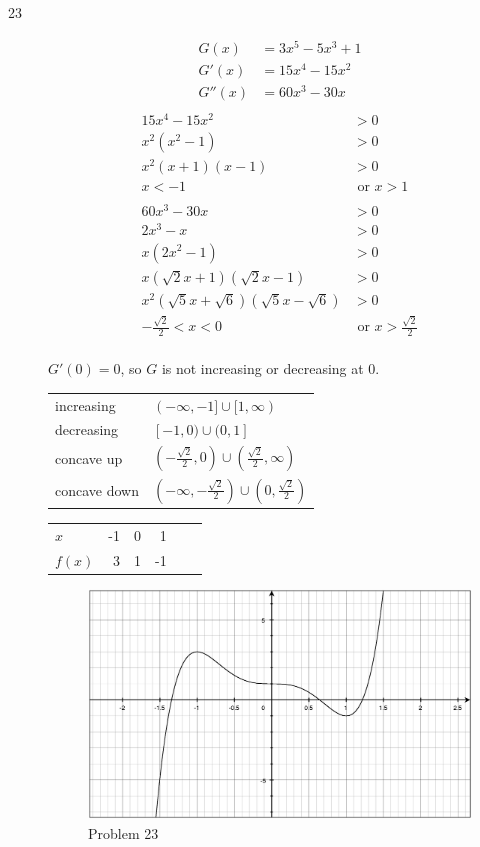 \documentclass[fleqn]{exam}
\begin{document}
\begin{description}
\item[23]
\begin{align*}
  G(x)   &= 3x^5 - 5x^3 + 1 \\
  G'(x)  &= 15x^4 - 15x^2  \\
  G''(x) &= 60x^3 - 30x \\
\end{align*}
\begin{align*}
  15x^4 - 15x^2 &> 0 \\
  x^2(x^2 - 1) &> 0 \\
  x^2(x+1)(x - 1) &> 0 \\
  x < -1 & \text{ or } x > 1 \\
\\
  60x^3 - 30x &> 0 \\
  2x^3 - x &> 0 \\
  x(2x^2 - 1) &> 0 \\
  x(\sqrt{2} x + 1)(\sqrt{2} x - 1) &> 0 \\
  x^2 (\sqrt{5}x + \sqrt{6}) (\sqrt{5}x - \sqrt{6}) &> 0 \\
  -\frac{\sqrt{2}}{2} < x < 0 & \text{ or } x > \frac{\sqrt{2}}{2} \\
\end{align*}

$G'(0) = 0$, so $G$ is not increasing or decreasing at 0.

\begin{tabular}{ll}
\toprule
increasing & $(-\infty, -1] \cup [1, \infty)$  \\
decreasing & $[-1, 0) \cup (0, 1]$ \\
\midrule
concave up & $\left(-\frac{\sqrt{2}}{2}, 0 \right) \cup \left(\frac{\sqrt{2}}{2}, \infty \right)$ \\
concave down & $\left(-\infty, -\frac{\sqrt{2}}{2} \right) \cup \left(0, \frac{\sqrt{2}}{2} \right)$ \\
\bottomrule
\end{tabular}

\begin{tabular}{lrrrrr}
\toprule
$x$    & -1 & 0 &  1 \\
$f(x)$ &  3 & 1 & -1 \\
\bottomrule
\end{tabular}

\begin{figure}[H]
  \centering
  \includegraphics[scale=.3]{problem_23.eps}
  \caption*{Problem 23}
\end{figure}


\end{description}
\end{document}
